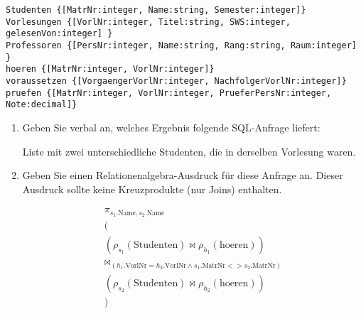 \documentclass{lehramt-informatik-haupt}
\begin{document}
\begin{verbatim}
Studenten {[MatrNr:integer, Name:string, Semester:integer]}
Vorlesungen {[VorlNr:integer, Titel:string, SWS:integer, gelesenVon:integer] }
Professoren {[PersNr:integer, Name:string, Rang:string, Raum:integer] }
hoeren {[MatrNr:integer, VorlNr:integer]}
voraussetzen {[VorgaengerVorlNr:integer, NachfolgerVorlNr:integer]}
pruefen {[MatrNr:integer, VorlNr:integer, PrueferPersNr:integer, Note:decimal]}
\end{verbatim}
\begin{enumerate}


\item Geben Sie verbal an, welches Ergebnis folgende SQL-Anfrage
liefert:

\begin{antwort}[muster]
Liste mit zwei unterschiedliche Studenten, die in derselben
Vorlesung waren.
\end{antwort}

%
\item Geben Sie einen Relationenalgebra-Ausdruck für diese Anfrage an.
Dieser Ausdruck sollte keine Kreuzprodukte (nur Joins) enthalten.

\begin{antwort}[muster]
\begin{multline*}
\pi_{s_1.\text{Name},s_2.\text{Name}}\\
(\\
  (\rho_{s_1} (\text{Studenten}) \bowtie \rho_{h_1} (\text{hoeren}))\\
  \bowtie_{(h_1.\text{VorlNr} = h_2.\text{VorlNr} \land s_1.\text{MatrNr} <> s_2.\text{MatrNr})}\\
  (\rho_{s_2} (\text{Studenten}) \bowtie \rho_{h_2} (\text{hoeren}))\\
)
\end{multline*}
\end{antwort}

\end{enumerate}
\end{document}

